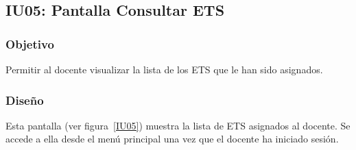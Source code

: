 \subsection{IU05: Pantalla Consultar ETS}


\newpage

\subsubsection{Objetivo}
Permitir al docente visualizar la lista de los ETS que le han sido asignados.

\subsubsection{Diseño}
Esta pantalla  (ver figura~\ref{IU05}) muestra la lista de ETS asignados al docente. Se accede a ella desde el menú principal una vez que el docente ha iniciado sesión.



